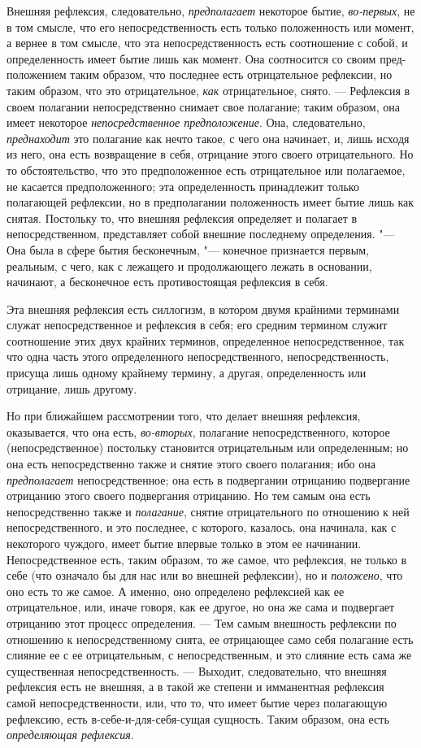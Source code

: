 Внешняя рефлексия, следовательно, {\em предполагает}
некоторое бытие, {\em во-первых}, не в том смысле, что
его непосредственность есть только положенность или момент, а вернее в том
смысле, что эта непосредственность есть соотношение с собой, и
определенность имеет бытие лишь как момент. Она соотносится со своим
пред-положением таким образом, что последнее есть отрицательное рефлексии,
но таким образом, что это отрицательное, {\em как}
отрицательное, снято. --- Рефлексия в своем полагании непосредственно снимает
свое полагание; таким образом, она имеет некоторое
{\em непосредственное предположение}. Она,
следовательно, {\em преднаходит} это полагание как
нечто такое, с чего она начинает, и, лишь исходя из него, она есть
возвращение в себя, отрицание этого своего отрицательного. Но то
обстоятельство, что это предположенное есть отрицательное или полагаемое,
не касается предположенного; эта определенность принадлежит только
полагающей рефлексии, но в предполагании положенность имеет бытие лишь как
снятая. Постольку то, что внешняя рефлексия определяет и полагает в
непосредственном, представляет собой внешние последнему определения. "--- Она
была в сфере бытия бесконечным, "--- конечное признается первым, реальным, с
чего, как с лежащего и продолжающего лежать в основании, начинают, а
бесконечное есть противостоящая рефлексия в себя.

Эта внешняя рефлексия есть силлогизм, в котором двумя крайними терминами
служат непосредственное и рефлексия в себя; его средним термином служит
соотношение этих двух крайних терминов, определенное непосредственное, так
что одна часть этого определенного непосредственного, непосредственность,
присуща лишь одному крайнему термину, а другая, определенность или
отрицание, лишь другому.

Но при ближайшем рассмотрении того, что делает внешняя рефлексия,
оказывается, что она есть, {\em во-вторых}, полагание
непосредственного, которое (непосредственное) постольку становится
отрицательным или определенным; но она есть непосредственно также и снятие
этого своего полагания; ибо она {\em предполагает}
непосредственное; она есть в подвергании отрицанию подвергание отрицанию
этого своего подвергания отрицанию. Но тем самым она есть непосредственно
также и {\em полагание}, снятие отрицательного по
отношению к ней непосредственного, и это последнее, с которого, казалось,
она начинала, как с некоторого чуждого, имеет бытие впервые только в этом
ее начинании. Непосредственное есть, таким образом, то же самое, что
рефлексия, не только в себе (что означало бы для нас или во внешней
рефлексии), но и {\em положено}, что оно есть то же
самое. А именно, оно определено рефлексией как ее отрицательное, или, иначе
говоря, как ее другое, но она же сама и подвергает отрицанию этот процесс
определения. --- Тем самым внешность рефлексии по отношению к
непосредственному снята, ее отрицающее само себя полагание есть слияние ее
с ее отрицательным, с непосредственным, и это слияние есть сама же
существенная непосредственность. --- Выходит, следовательно, что внешняя
рефлексия есть не внешняя, а в такой же степени и имманентная рефлексия
самой непосредственности, или, что то, что имеет бытие через полагающую
рефлексию, есть в-себе-и-для-себя-сущая сущность. Таким образом, она есть
{\em определяющая рефлексия}.

